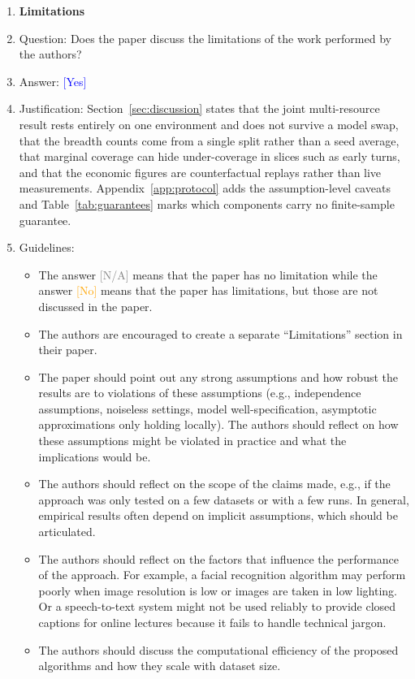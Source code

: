 \documentclass{article}
\providecommand{\answerYes}[1][]{\textcolor{blue}{[Yes] #1}}
\providecommand{\answerNo}[1][]{\textcolor{orange}{[No] #1}}
\providecommand{\answerNA}[1][]{\textcolor{gray}{[N/A] #1}}
\begin{document}
\begin{enumerate}
\item {\bf Limitations}
    \item[] Question: Does the paper discuss the limitations of the work performed by the authors?
    \item[] Answer: \answerYes{}
    \item[] Justification: Section~\ref{sec:discussion} states that the joint multi-resource result rests entirely on one environment and does not survive a model swap, that the breadth counts come from a single split rather than a seed average, that marginal coverage can hide under-coverage in slices such as early turns, and that the economic figures are counterfactual replays rather than live measurements. Appendix~\ref{app:protocol} adds the assumption-level caveats and Table~\ref{tab:guarantees} marks which components carry no finite-sample guarantee.
    \item[] Guidelines:
    \begin{itemize}
        \item The answer \answerNA{} means that the paper has no limitation while the answer \answerNo{} means that the paper has limitations, but those are not discussed in the paper.
        \item The authors are encouraged to create a separate ``Limitations'' section in their paper.
        \item The paper should point out any strong assumptions and how robust the results are to violations of these assumptions (e.g., independence assumptions, noiseless settings, model well-specification, asymptotic approximations only holding locally). The authors should reflect on how these assumptions might be violated in practice and what the implications would be.
        \item The authors should reflect on the scope of the claims made, e.g., if the approach was only tested on a few datasets or with a few runs. In general, empirical results often depend on implicit assumptions, which should be articulated.
        \item The authors should reflect on the factors that influence the performance of the approach. For example, a facial recognition algorithm may perform poorly when image resolution is low or images are taken in low lighting. Or a speech-to-text system might not be used reliably to provide closed captions for online lectures because it fails to handle technical jargon.
        \item The authors should discuss the computational efficiency of the proposed algorithms and how they scale with dataset size.

\end{itemize}
\end{enumerate}
\end{document}
